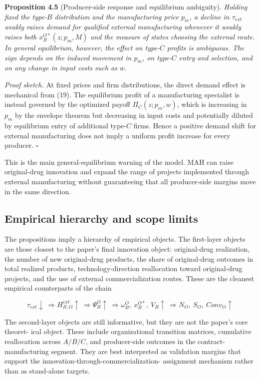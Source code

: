 \documentclass[12pt]{article}
\begin{document}
\textbf{Proposition 4.5} (Producer-side response and equilibrium ambiguity). \textit{Holding fixed the
type-$B$ distribution and the manufacturing price $p_m$, a decline in $\tau_{ext}$ weakly raises demand
for qualified external manufacturing whenever it weakly raises both $x_B^{O*}(z;p_m,M)$ and the
measure of states choosing the external route. In general equilibrium, however, the effect on
type-$C$ profits is ambiguous. The sign depends on the induced movement in $p_m$, on type-$C$
entry and selection, and on any change in input costs such as $w$.}

\textit{Proof sketch.} At fixed prices and firm distributions, the direct demand effect is mechanical from (19). The equilibrium profit of a manufacturing specialist is instead governed by the optimized payoff $\Pi_C(z;p_m,w)$, which is increasing in $p_m$ by the envelope theorem but decreasing in input costs and potentially diluted by equilibrium entry of additional type-$C$ firms. Hence a positive demand shift for external manufacturing does not imply a uniform profit increase for every producer. \hfill$\square$

This is the main general-equilibrium warning of the model. MAH can raise original-drug
innovation and expand the range of projects implemented through external manufacturing
without guaranteeing that all producer-side margins move in the same direction.
\subsection{Empirical hierarchy and scope limits}

The propositions imply a hierarchy of empirical objects. The first-layer objects are those
closest to the paper's final innovation object: original-drug realization, the number of new
original-drug products, the share of original-drug outcomes in total realized products,
technology-direction reallocation toward original-drug projects, and the use of external
commercialization routes. These are the cleanest empirical counterparts of the chain

\[
\tau_{ext} \downarrow\ \Rightarrow H_{B,O}^{ext} \uparrow\ \Rightarrow \Psi_B^O \uparrow\ \Rightarrow \omega_B^O,\ x_B^{O*},\ V_B \uparrow\ \Rightarrow N_O,\ S_O,\ Conv_O \uparrow
\]

The second-layer objects are still informative, but they are not the paper's core theoret-
ical object. These include organizational transition matrices, cumulative reallocation across
$A/B/C$, and producer-side outcomes in the contract-manufacturing segment. They are best
interpreted as validation margins that support the innovation-through-commercialization-
assignment mechanism rather than as stand-alone targets.
\end{document}
